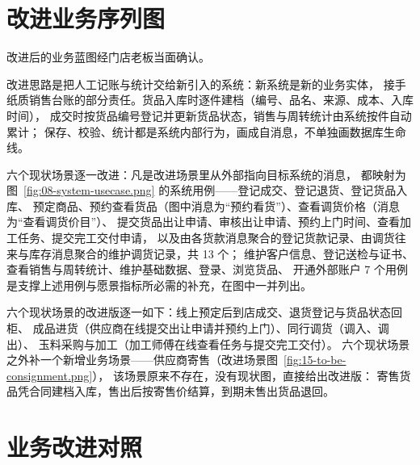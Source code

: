 \section{改进业务序列图}

改进后的业务蓝图经门店老板当面确认。

改进思路是把人工记账与统计交给新引入的系统：新系统是新的业务实体，
接手纸质销售台账的部分责任。货品入库时逐件建档（编号、品名、来源、成本、入库时间），
成交时按货品编号登记并更新货品状态，销售与周转统计由系统按件自动累计；
保存、校验、统计都是系统内部行为，画成自消息，不单独画数据库生命线。

六个现状场景逐一改进：凡是改进场景里从外部指向目标系统的消息，
都映射为图~\ref{fig:08-system-usecase.png} 的系统用例——登记成交、登记退货、登记货品入库、
预定商品、预约查看货品（图中消息为“预约看货”）、查看调货价格（消息为“查看调货价目”）、
提交货品出让申请、审核出让申请、预约上门时间、查看加工任务、提交完工交付申请，
以及由各货款消息聚合的登记货款记录、由调货往来与库存消息聚合的维护调货记录，共 13 个；
维护客户信息、登记送检与证书、查看销售与周转统计、维护基础数据、登录、浏览货品、
开通外部账户 7 个用例是支撑上述用例与愿景指标所必需的补充，在图中一并列出。

六个现状场景的改进版逐一如下：线上预定后到店成交、退货登记与货品状态回柜、
成品进货（供应商在线提交出让申请并预约上门）、同行调货（调入、调出）、
玉料采购与加工（加工师傅在线查看任务与提交完工交付）。
六个现状场景之外补一个新增业务场景——供应商寄售（改进场景图~\ref{fig:15-to-be-consignment.png}），
该场景原来不存在，没有现状图，直接给出改进版：
寄售货品凭合同建档入库，售出后按寄售价结算，到期未售出货品退回。


\section{业务改进对照}

